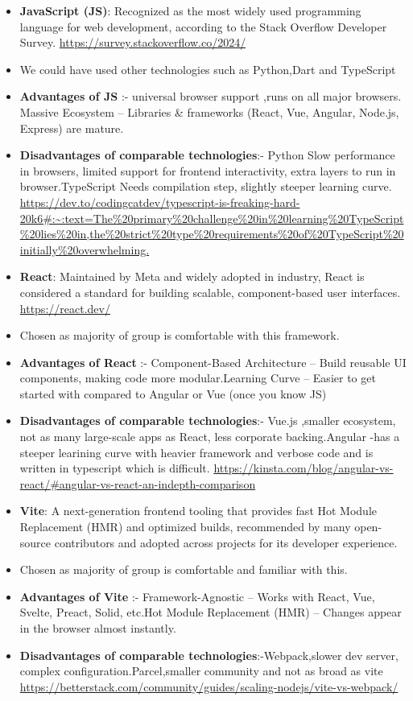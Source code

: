 \begin{itemize}
    \item \textbf{JavaScript (JS)}: Recognized as the most widely used programming language for web development, according to the Stack Overflow Developer Survey.  
    \url{https://survey.stackoverflow.co/2024/}
    \item We could have used other technologies such as Python,Dart and TypeScript
    \item\textbf {Advantages of JS} :- universal browser support ,runs on all major browsers. Massive Ecosystem – Libraries \& frameworks (React, Vue, Angular, Node.js, Express) are mature.
    \item \textbf{Disadvantages of comparable technologies}:- Python Slow performance in browsers, limited support for frontend interactivity, extra layers to run in browser.TypeScript Needs compilation step, slightly steeper learning curve.
    \url{https://dev.to/codingcatdev/typescript-is-freaking-hard-20k6#:~:text=The%20primary%20challenge%20in%20learning%20TypeScript%20lies%20in,the%20strict%20type%20requirements%20of%20TypeScript%20initially%20overwhelming.} 

    \item \textbf{React}: Maintained by Meta and widely adopted in industry, React is considered a standard for building scalable, component-based user interfaces. 
    \url{https://react.dev/}
        \item Chosen as majority of group is comfortable with this framework.
    \item\textbf {Advantages of React} :- Component-Based Architecture – Build reusable UI components, making code more modular.Learning Curve – Easier to get started with compared to Angular or Vue (once you know JS)
    \item \textbf{Disadvantages of comparable technologies}:- Vue.js ,smaller ecosystem, not as many large-scale apps as React, less corporate backing.Angular -has a steeper learining curve with heavier framework and verbose code and is written in typescript which is difficult.
    \url{https://kinsta.com/blog/angular-vs-react/#angular-vs-react-an-indepth-comparison} 
    
    \item \textbf{Vite}: A next-generation frontend tooling that provides fast Hot Module Replacement (HMR) and optimized builds, recommended by many open-source contributors and adopted across projects for its developer experience.
    \item Chosen as majority of group is comfortable and familiar with this.
    \item\textbf {Advantages of Vite} :- Framework-Agnostic – Works with React, Vue, Svelte, Preact, Solid, etc.Hot Module Replacement (HMR) – Changes appear in the browser almost instantly.
    \item \textbf{Disadvantages of comparable technologies}:-Webpack,slower dev server, complex configuration.Parcel,smaller community and not as broad as vite
    \url{https://betterstack.com/community/guides/scaling-nodejs/vite-vs-webpack/}


\end{itemize}
